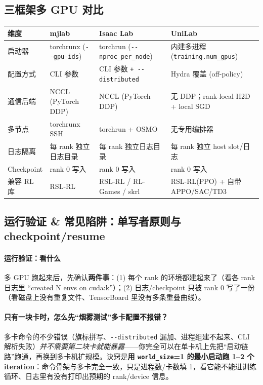 \subsection{三框架多 GPU 对比}
\label{sec:rlmc-ls-multigpu-compare}

\begin{center}
\small
\begin{tabular}{@{}p{2.4cm}p{3.4cm}p{3.6cm}p{2.4cm}@{}}
\toprule
维度 & mjlab & Isaac Lab & UniLab \\
\midrule
启动器 & torchrunx (\verb|--gpu-ids|) & torchrun (\verb|--nproc_per_node|) & 内建多进程 (\verb|training.num_gpus|) \\
配置方式 & CLI 参数 & CLI 参数 \verb|+ --distributed| & Hydra 覆盖 (off-policy) \\
通信后端 & NCCL (PyTorch DDP) & NCCL (PyTorch DDP) & 无 DDP；rank-local H2D + local SGD \\
多节点 & torchrunx SSH & torchrun + OSMO & 无专用编排器 \\
日志隔离 & 每 rank 独立日志目录 & 每 rank 独立日志目录 & 每 rank 独立 host slot/日志 \\
Checkpoint & rank 0 写入 & rank 0 写入 & rank 0 写入 \\
兼容 RL 库 & RSL-RL & RSL-RL / RL-Games / skrl & RSL-RL(PPO) + 自带 APPO/SAC/TD3 \\
\bottomrule
\end{tabular}
\end{center}

\subsection{运行验证 \& 常见陷阱：单写者原则与 checkpoint/resume}
\label{sec:rlmc-ls-single-writer}

\paragraph{\texorpdfstring{ 运行验证：看什么}{4 运行验证：看什么}}多 GPU 跑起来后，先确认\textbf{两件事}：(1) 每个 rank 的环境都建起来了（看各 rank 日志里 “created N envs on cuda:k”）；(2) 日志/checkpoint 只被 rank 0 写了一份（看磁盘上没有重复文件、TensorBoard 里没有多条重叠曲线）。

\paragraph{\texorpdfstring{只有一块卡时，怎么先“烟雾测试”多卡配置不报错？}{只有一块卡时，怎么先烟雾测试多卡配置}}多卡命令的不少错误（旗标拼写、\verb|--distributed| 漏加、进程组建不起来、CLI 解析失败）\emph{并不需要第二块卡就能暴露}——你完全可以在单卡机上先把“启动链路”跑通，再换到多卡机扩规模。诀窍是\textbf{用 \texttt{world\_size}=1 的最小启动跑 1--2 个 iteration}：命令骨架与多卡完全一致，只是进程数/卡数填 1，看它能不能进训练循环、日志里有没有打印出预期的 rank/device 信息。

